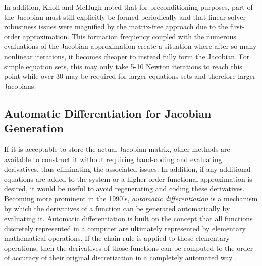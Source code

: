 In addition, Knoll and McHugh noted that for preconditioning purposes,
part of the Jacobian must still explicitly be formed periodically and
that linear solver robustness issues were magnified by the matrix-free
approach due to the first-order approximation. This formation
frequency coupled with the numerous evaluations of the Jacobian
approximation create a situation where after so many nonlinear
iterations, it becomes cheaper to instead fully form the Jacobian. For
simple equation sets, this may only take 5-10 Newton iterations to
reach this point while over 30 may be required for larger equations
sets and therefore larger Jacobians.

\subsection{Automatic Differentiation for Jacobian Generation}
\label{subsec:automatic_differentiation}
If it is acceptable to store the actual Jacobian matrix, other methods
are available to construct it without requiring hand-coding and
evaluating derivatives, thus eliminating the associated issues. In
addition, if any additional equations are added to the system or a
higher order functional approximation is desired, it would be useful
to avoid regenerating and coding these derivatives. Becoming more
prominent in the 1990's, \textit{automatic differentiation} is a
mechanism by which the derivatives of a function can be generated
automatically by evaluating it. Automatic differentiation is built on
the concept that all functions discretely represented in a computer
are ultimately represented by elementary mathematical operations. If
the chain rule is applied to those elementary operations, then the
derivatives of those functions can be computed to the order of
accuracy of their original discretization in a completely automated
way \citep{averick_computing_1994}.

